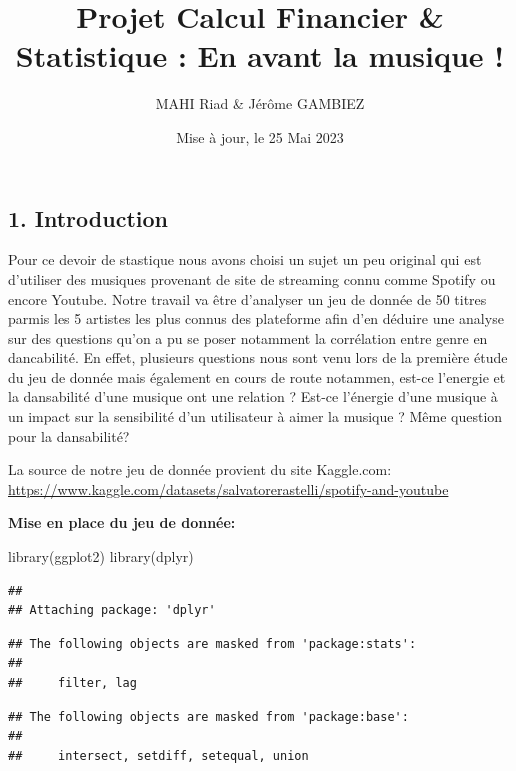 \documentclass[
]{article}
\title{Projet Calcul Financier \& Statistique : En avant la musique !}
\author{MAHI Riad \& Jérôme GAMBIEZ}
\date{Mise à jour, le 25 Mai 2023}
\newenvironment{Shaded}{\begin{snugshade}}{\end{snugshade}}
\newcommand{\FunctionTok}[1]{\textcolor[rgb]{0.00,0.00,0.00}{#1}}
\newcommand{\NormalTok}[1]{#1}
\begin{document}
\maketitle

{
\setcounter{tocdepth}{2}
\tableofcontents
}
\hypertarget{introduction}{%
\subsection{1. Introduction}\label{introduction}}

Pour ce devoir de stastique nous avons choisi un sujet un peu original
qui est d'utiliser des musiques provenant de site de streaming connu
comme Spotify ou encore Youtube. Notre travail va être d'analyser un jeu
de donnée de 50 titres parmis les 5 artistes les plus connus des
plateforme afin d'en déduire une analyse sur des questions qu'on a pu se
poser notamment la corrélation entre genre en dancabilité. En effet,
plusieurs questions nous sont venu lors de la première étude du jeu de
donnée mais également en cours de route notammen, est-ce l'energie et la
dansabilité d'une musique ont une relation ? Est-ce l'énergie d'une
musique à un impact sur la sensibilité d'un utilisateur à aimer la
musique ? Même question pour la dansabilité? \newline

La source de notre jeu de donnée provient du site Kaggle.com: \newline
\url{https://www.kaggle.com/datasets/salvatorerastelli/spotify-and-youtube}

\textbf{Mise en place du jeu de donnée:}

\begin{Shaded}
\begin{Highlighting}[]
  \FunctionTok{library}\NormalTok{(ggplot2)}
  \FunctionTok{library}\NormalTok{(dplyr)}
\end{Highlighting}
\end{Shaded}

\begin{verbatim}
## 
## Attaching package: 'dplyr'
\end{verbatim}

\begin{verbatim}
## The following objects are masked from 'package:stats':
## 
##     filter, lag
\end{verbatim}

\begin{verbatim}
## The following objects are masked from 'package:base':
## 
##     intersect, setdiff, setequal, union
\end{verbatim}
\end{document}

